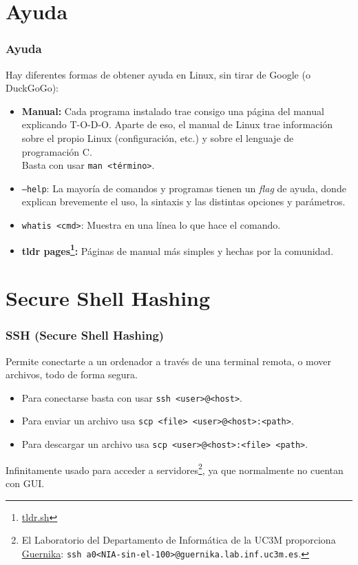 \documentclass[aspectratio=43]{beamer}
\begin{document}
\section{Ayuda}

\begin{frame}
    \frametitle{Ayuda}
    Hay diferentes formas de obtener ayuda en Linux, sin tirar de Google (o DuckGoGo):

    \begin{itemize}
        \item \textbf{Manual:} Cada programa instalado trae consigo una página del manual explicando T-O-D-O. Aparte de eso, el manual de Linux trae información sobre el propio Linux (configuración, etc.) y sobre el lenguaje de programación C.\\
        Basta con usar \texttt{man <término>}.
        \item \texttt{--help}: La mayoría de comandos y programas tienen un \textit{flag} de ayuda, donde explican brevemente el uso, la sintaxis y las distintas opciones y parámetros.
        \item \texttt{whatis <cmd>}: Muestra en una línea lo que hace el comando.
        \item \textbf{tldr pages\footnote{\href{https://tldr.sh/}{tldr.sh}}:} Páginas de manual más simples y hechas por la comunidad.
    \end{itemize}
\end{frame}


\section{Secure Shell Hashing}


\begin{frame}
    \frametitle{SSH (Secure Shell Hashing)}
    Permite conectarte a un ordenador a través de una terminal remota, o mover archivos, todo de forma segura.

    \begin{itemize}
        \item Para conectarse basta con usar \texttt{ssh <user>@<host>}.
        \item Para enviar un archivo usa \texttt{scp <file> <user>@<host>:<path>}.
        \item Para descargar un archivo usa \texttt{scp <user>@<host>:<file> <path>}.
    \end{itemize}

    Infinitamente usado para acceder a servidores\footnote{El Laboratorio del Departamento de Informática de la UC3M proporciona \href{https://www.lab.inf.uc3m.es/wp-content/docs/Manual_ConexionSSH.pdf}{Guernika}: \texttt{ssh a0<NIA-sin-el-100>@guernika.lab.inf.uc3m.es}.}, ya que normalmente no cuentan con GUI.

\end{frame}
\end{document}

